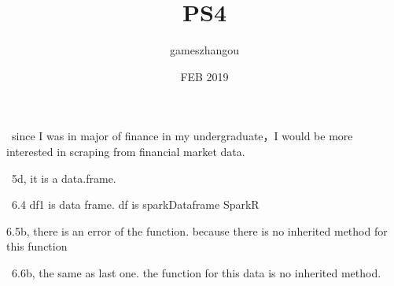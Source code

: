 \documentclass{article}
\title{PS4}
\author{gameszhangou }
\date{ FEB 2019 }
\begin{document}
\
since I was in major of finance in my undergraduate，I would be more interested in scraping from financial market data.

\
5d, it is a data.frame.

\
 6.4 df1 is data frame. df is sparkDataframe SparkR
\

 6.5b, there is an error of the function. because there is no inherited method for this function

\
6.6b, the same as last one. the function for this data is no inherited method.
\end{document}
